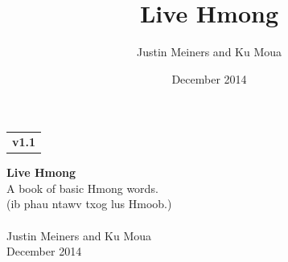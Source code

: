 \documentclass{article}
\title{Live Hmong}
\author{Justin Meiners and Ku Moua}
\date{December 2014}
\begin{document}
\begin{titlepage}

\null\hfill\begin{tabular}[t]{l@{}}
  \textbf{v1.1}
\end{tabular}

\begin{center}

\setlength\fboxsep{0pt}
\setlength\fboxrule{0.0pt}

 \textbf{Live Hmong} \\
\large A book of basic Hmong words. \\
(ib phau ntawv txog lus Hmoob.) \\
~ \\
Justin Meiners and Ku Moua \\
December 2014

\end{center}

\end{titlepage}
\end{document}
